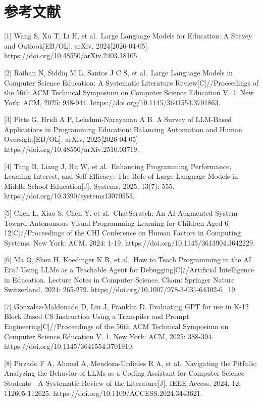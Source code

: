 \chapter*{参考文献}\label{ux53c2ux8003ux6587ux732e}

{[}1{]} Wang S, Xu T, Li H, et al.~Large Language Models for Education: A Survey and Outlook{[}EB/OL{]}. arXiv, 2024{[}2026-04-05{]}. https://doi.org/10.48550/arXiv.2403.18105.

{[}2{]} Raihan N, Siddiq M L, Santos J C S, et al.~Large Language Models in Computer Science Education: A Systematic Literature Review{[}C{]}//Proceedings of the 56th ACM Technical Symposium on Computer Science Education V. 1. New York: ACM, 2025: 938-944. https://doi.org/10.1145/3641554.3701863.

{[}3{]} Pitts G, Hridi A P, Lekshmi-Narayanan A B. A Survey of LLM-Based Applications in Programming Education: Balancing Automation and Human Oversight{[}EB/OL{]}. arXiv, 2025{[}2026-04-05{]}. https://doi.org/10.48550/arXiv.2510.03719.

{[}4{]} Tang B, Liang J, Hu W, et al.~Enhancing Programming Performance, Learning Interest, and Self-Efficacy: The Role of Large Language Models in Middle School Education{[}J{]}. Systems, 2025, 13(7): 555. https://doi.org/10.3390/systems13070555.

{[}5{]} Chen L, Xiao S, Chen Y, et al.~ChatScratch: An AI-Augmented System Toward Autonomous Visual Programming Learning for Children Aged 6-12{[}C{]}//Proceedings of the CHI Conference on Human Factors in Computing Systems. New York: ACM, 2024: 1-19. https://doi.org/10.1145/3613904.3642229.

{[}6{]} Ma Q, Shen H, Koedinger K R, et al.~How to Teach Programming in the AI Era? Using LLMs as a Teachable Agent for Debugging{[}C{]}//Artificial Intelligence in Education. Lecture Notes in Computer Science. Cham: Springer Nature Switzerland, 2024: 265-279. https://doi.org/10.1007/978-3-031-64302-6\_19.

{[}7{]} Gonzalez-Maldonado D, Liu J, Franklin D. Evaluating GPT for use in K-12 Block Based CS Instruction Using a Transpiler and Prompt Engineering{[}C{]}//Proceedings of the 56th ACM Technical Symposium on Computer Science Education V. 1. New York: ACM, 2025: 388-394. https://doi.org/10.1145/3641554.3701910.

{[}8{]} Pirzado F A, Ahmed A, Mendoza-Urdiales R A, et al.~Navigating the Pitfalls: Analyzing the Behavior of LLMs as a Coding Assistant for Computer Science Students---A Systematic Review of the Literature{[}J{]}. IEEE Access, 2024, 12: 112605-112625. https://doi.org/10.1109/ACCESS.2024.3443621.

